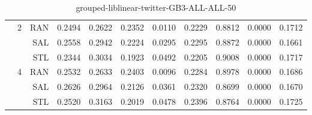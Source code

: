 \begin{center}
\begin{table}[htbp]
\begin{center}
\begin{tabular}{ | r | r | r | r | r | r | r | r | r | r | r |}
 & \multirow{3}{*}{2} & RAN & 0.2494 & 0.2622 & 0.2352 & 0.0110 & 0.2229 & 0.8812 & 0.0000 & 0.1712\\ \cline{3-11}
 &   & SAL & 0.2558 & 0.2942 & 0.2224 & 0.0295 & 0.2295 & 0.8872 & 0.0000 & 0.1661\\ \cline{3-11}
 &   & STL & 0.2344 & 0.3034 & 0.1923 & 0.0492 & 0.2205 & 0.9008 & 0.0000 & 0.1717\\ \cline{2-11}
 & \multirow{3}{*}{4} & RAN & 0.2532 & 0.2633 & 0.2403 & 0.0096 & 0.2284 & 0.8978 & 0.0000 & 0.1686\\ \cline{3-11}
 &   & SAL & 0.2626 & 0.2964 & 0.2126 & 0.0361 & 0.2320 & 0.8699 & 0.0000 & 0.1670\\ \cline{3-11}
 &   & STL & 0.2520 & 0.3163 & 0.2019 & 0.0478 & 0.2396 & 0.8764 & 0.0000 & 0.1725\\ \cline{2-11}
\hline
\end{tabular}
\caption{grouped-liblinear-twitter-GB3-ALL-ALL-50}
\end{center}
 \end{table}
\end{center}

